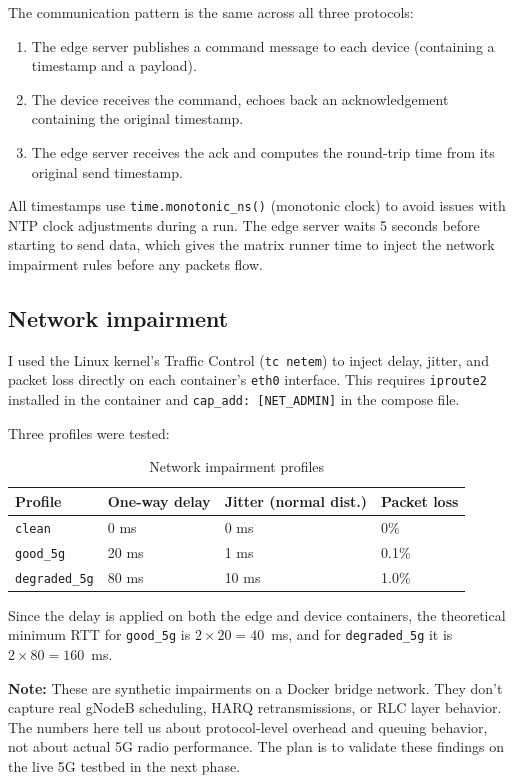\documentclass[11pt,a4paper]{article}
\begin{document}
The communication pattern is the same across all three protocols:
\begin{enumerate}
    \item The edge server publishes a command message to each device (containing a timestamp and a payload).
    \item The device receives the command, echoes back an acknowledgement containing the original timestamp.
    \item The edge server receives the ack and computes the round-trip time from its original send timestamp.
\end{enumerate}

All timestamps use \texttt{time.monotonic\_ns()} (monotonic clock) to avoid issues with NTP clock adjustments during a run. The edge server waits 5 seconds before starting to send data, which gives the matrix runner time to inject the network impairment rules before any packets flow.

\subsection{Network impairment}

I used the Linux kernel's Traffic Control (\texttt{tc netem}) to inject delay, jitter, and packet loss directly on each container's \texttt{eth0} interface. This requires \texttt{iproute2} installed in the container and \texttt{cap\_add: [NET\_ADMIN]} in the compose file.

Three profiles were tested:

\begin{table}[H]
\centering
\caption{Network impairment profiles}
\label{tab:profiles}
\begin{tabular}{llll}
\toprule
Profile & One-way delay & Jitter (normal dist.) & Packet loss \\
\midrule
\texttt{clean} & 0 ms & 0 ms & 0\% \\
\texttt{good\_5g} & 20 ms & 1 ms & 0.1\% \\
\texttt{degraded\_5g} & 80 ms & 10 ms & 1.0\% \\
\bottomrule
\end{tabular}
\end{table}

Since the delay is applied on both the edge and device containers, the theoretical minimum RTT for \texttt{good\_5g} is $2 \times 20 = 40$~ms, and for \texttt{degraded\_5g} it is $2 \times 80 = 160$~ms.

\textbf{Note:} These are synthetic impairments on a Docker bridge network. They don't capture real gNodeB scheduling, HARQ retransmissions, or RLC layer behavior. The numbers here tell us about protocol-level overhead and queuing behavior, not about actual 5G radio performance. The plan is to validate these findings on the live 5G testbed in the next phase.
\end{document}
